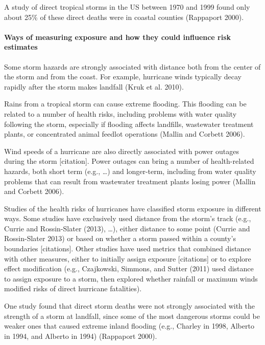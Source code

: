 \documentclass[]{elsarticle} %
\begin{document}
A study of direct tropical storms in the US between 1970 and 1999 found
only about 25\% of these direct deaths were in coastal counties
(Rappaport 2000).

\paragraph{Ways of measuring exposure and how they could influence risk
estimates}\label{ways-of-measuring-exposure-and-how-they-could-influence-risk-estimates}

Some storm hazards are strongly associated with distance both from the
center of the storm and from the coast. For example, hurricane winds
typically decay rapidly after the storm makes landfall (Kruk et al.
2010).

Rains from a tropical storm can cause extreme flooding. This flooding
can be related to a number of health risks, including problems with
water quality following the storm, especially if flooding affects
landfills, wastewater treatment plants, or concentrated animal feedlot
operations (Mallin and Corbett 2006).

Wind speeds of a hurricane are also directly associated with power
outages during the storm {[}citation{]}. Power outages can bring a
number of health-related hazards, both short term (e.g., \ldots{}) and
longer-term, including from water quality problems that can result from
wastewater treatment plants losing power (Mallin and Corbett 2006).

Studies of the health risks of hurricanes have classified storm exposure
in different ways. Some studies have exclusively used distance from the
storm's track (e.g., Currie and Rossin-Slater (2013), \ldots{}), either
distance to some point (Currie and Rossin-Slater 2013) or based on
whether a storm passed within a county's boundaries {[}citations{]}.
Other studies have used metrics that combined distance with other
measures, either to initially assign exposure {[}citations{]} or to
explore effect modification (e.g., Czajkowski, Simmons, and Sutter
(2011) used distance to assign exposure to a storm, then explored
whether rainfall or maximum winds modified risks of direct hurricane
fatalities).

One study found that direct storm deaths were not strongly associated
with the strength of a storm at landfall, since some of the most
dangerous storms could be weaker ones that caused extreme inland
flooding (e.g., Charley in 1998, Alberto in 1994, and Alberto in 1994)
(Rappaport 2000).
\end{document}
